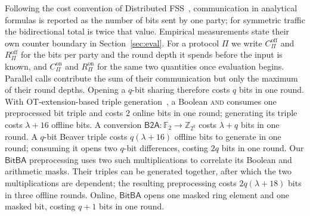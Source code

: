 \documentclass[journal]{IEEEtran}
\theoremstyle{definition}
\theoremstyle{plain}
\newcommand{\Z}{\mathbb{Z}}
\newcommand{\F}{\mathbb{F}}
\newcommand{\BitBA}{\mathsf{BitBA}}
\begin{document}
Following the cost convention of Distributed FSS~\cite{distfss}, communication
in analytical formulas is reported as the number of bits sent by one party;
for symmetric traffic the bidirectional total is twice that value. Empirical
measurements state their own counter boundary in Section~\ref{sec:eval}.
For a protocol $\Pi$ we write
$C^{\mathrm{off}}_{\Pi}$ and $R^{\mathrm{off}}_{\Pi}$ for the bits per party and
the round depth it spends before the input is known, and
$C^{\mathrm{on}}_{\Pi}$ and $R^{\mathrm{on}}_{\Pi}$ for the same two quantities
once evaluation begins. Parallel calls contribute the sum of their
communication but only the maximum of their round depths. Opening a $q$-bit
sharing therefore costs $q$ bits in one round. With OT-extension-based
triple generation~\cite{cryptflow2}, a Boolean \textsc{and} consumes one
preprocessed bit triple and costs $2$ online bits in one round; generating
its triple costs $\lambda+16$ offline bits. A conversion
$\mathsf{B2A}:\F_2\rightarrow\Z_{2^q}$ costs $\lambda+q$ bits in one round.
A $q$-bit Beaver triple costs $q(\lambda+16)$ offline bits to generate
in one round; consuming it opens two $q$-bit
differences, costing $2q$ bits in one round. Our $\BitBA$ preprocessing uses two such
multiplications to correlate its Boolean and arithmetic masks. Their triples
can be generated together, after which the two multiplications are dependent;
the resulting preprocessing costs $2q(\lambda+18)$ bits in three offline
rounds. Online, $\BitBA$ opens one masked ring element and one masked bit,
costing $q+1$ bits in one round.
\end{document}
